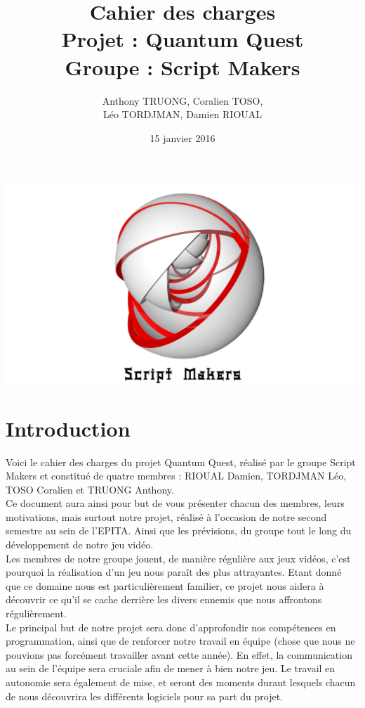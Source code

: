 \documentclass[A4paper,11pt]{article}
\title{\textbf{\Huge Cahier des charges}\\Projet : Quantum Quest\\ Groupe : Script Makers}
\author{Anthony TRUONG, Coralien TOSO,\\ L\'eo TORDJMAN, Damien RIOUAL}
\date{15 janvier 2016}
\begin{document}
\maketitle
\begin{center}
\includegraphics[scale=0.25]{logo.png}
\end{center}
\newpage
\tableofcontents
\newpage

\section{Introduction}
Voici le cahier des charges du projet Quantum Quest, r\'ealis\'e par le groupe Script Makers et constitu\'e de quatre membres : RIOUAL Damien, TORDJMAN L\'eo, TOSO Coralien et TRUONG Anthony.\\

Ce document aura ainsi pour but de vous pr\'esenter chacun des membres, leurs motivations, mais surtout notre projet, r\'ealis\'e \`a l'occasion de notre second semestre au sein de l'EPITA. Ainsi que les pr\'evisions, du groupe tout le long du d\'eveloppement de notre jeu vid\'eo.\\

Les membres de notre groupe jouent, de mani\`ere r\'eguli\`ere aux jeux vid\'eos, c'est pourquoi la r\'ealisation d'un jeu nous para\^it des plus attrayantes. Etant donn\'e que ce domaine nous est particuli\`erement familier, ce projet nous aidera \`a d\'ecouvrir ce qu'il se cache derri\`ere les divers ennemis que nous affrontons r\'eguli\`erement.\\

Le principal but de notre projet sera donc d'approfondir nos comp\'etences en programmation, ainsi que de renforcer notre travail en \'equipe (chose que nous ne pouvions pas forc\'ement travailler avant cette ann\'ee). En effet, la communication au sein de l'\'equipe sera cruciale afin de mener \`a bien notre jeu. Le travail en autonomie sera \'egalement de mise, et seront des moments durant lesquels chacun de nous d\'ecouvrira les diff\'erents logiciels pour sa part du projet.\\
\end{document}
